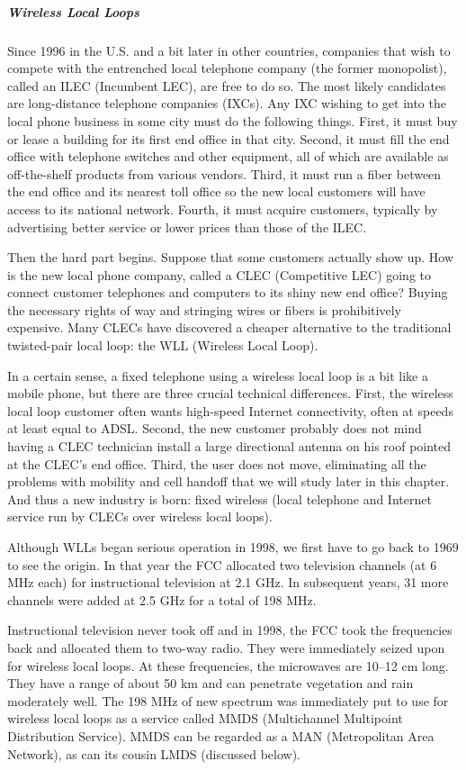 \subparagraph{Wireless Local Loops}

Since 1996 in the U.S. and a bit later in other countries, companies
that wish to compete with the entrenched local telephone company (the
former monopolist), called an {ILEC} ({Incumbent LEC}), are free to do
so. The most likely candidates are long-distance telephone companies
(IXCs). Any IXC wishing to get into the local phone business in some
city must do the following things. First, it must buy or lease a
building for its first end office in that city. Second, it must fill the
end office with telephone switches and other equipment, all of which are
available as off-the-shelf products from various vendors. Third, it must
run a fiber between the end office and its nearest toll office so the
new local customers will have access to its national network. Fourth, it
must acquire customers, typically by advertising better service or lower
prices than those of the ILEC.

Then the hard part begins. Suppose that some customers actually show up.
How is the new local phone company, called a {CLEC} ({Competitive LEC})
going to connect customer telephones and computers to its shiny new end
office? Buying the necessary rights of way and stringing wires or fibers
is prohibitively expensive. Many CLECs have discovered a cheaper
alternative to the traditional twisted-pair local loop: the {WLL}
({Wireless Local Loop}).

In a certain sense, a fixed telephone using a wireless local loop is a
bit like a mobile phone, but there are three crucial technical
differences. First, the wireless local loop customer often wants
high-speed Internet connectivity, often at speeds at least equal to
ADSL. Second, the new customer probably does not mind having a CLEC
technician install a large directional antenna on his roof pointed at
the CLEC's end office. Third, the user does not move, eliminating all
the problems with mobility and cell handoff that we will study later in
this chapter. And thus a new industry is born: {fixed wireless} (local
telephone and Internet service run by CLECs over wireless local loops).

Although WLLs began serious operation in 1998, we first have to go back
to 1969 to see the origin. In that year the FCC allocated two television
channels (at 6 MHz each) for instructional television at 2.1 GHz. In
subsequent years, 31 more channels were added at 2.5 GHz for a total of
198 MHz.

Instructional television never took off and in 1998, the FCC took the
frequencies back and allocated them to two-way radio. They were
immediately seized upon for wireless local loops. At these frequencies,
the microwaves are 10--12 cm long. They have a range of about 50 km and
can penetrate vegetation and rain moderately well. The 198 MHz of new
spectrum was immediately put to use for wireless local loops as a
service called {MMDS} ({Multichannel Multipoint Distribution Service}).
MMDS can be regarded as a MAN (Metropolitan Area Network), as can its
cousin LMDS (discussed below).

